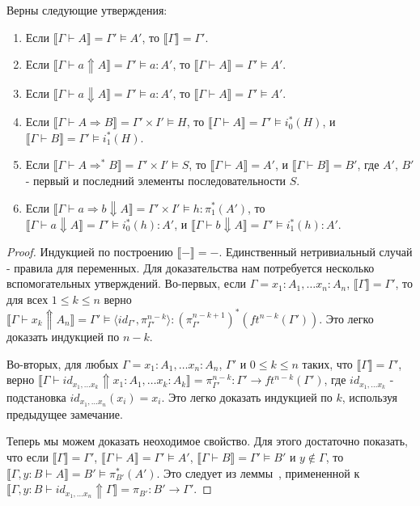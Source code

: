 \documentclass{amsart}
\theoremstyle{definition}
\theoremstyle{remark}
\newcommand{\red}{\Rightarrow}
\renewcommand{\ll}{\llbracket}
\newcommand{\rr}{\rrbracket}
\numberwithin{figure}{section}
\begin{document}
\begin{lem}
Верны следующие утверждения:
\begin{enumerate}
\item Если $\ll \Gamma \vdash A \rr = \Gamma' \models A'$, то $\ll \Gamma \rr = \Gamma'$.
\item Если $\ll \Gamma \vdash a \Uparrow A \rr = \Gamma' \models a : A'$, то $\ll \Gamma \vdash A \rr = \Gamma' \models A'$.
\item Если $\ll \Gamma \vdash a \Downarrow A \rr = \Gamma' \models a : A'$, то $\ll \Gamma \vdash A \rr = \Gamma' \models A'$.
\item Если $\ll \Gamma \vdash A \red B \rr = \Gamma' \times I' \models H$, то $\ll \Gamma \vdash A \rr = \Gamma' \models i_0^*(H)$, и $\ll \Gamma \vdash B \rr = \Gamma' \models i_1^*(H)$.
\item Если $\ll \Gamma \vdash A \red^* B \rr = \Gamma' \times I' \models S$, то $\ll \Gamma \vdash A \rr = A'$, и $\ll \Gamma \vdash B \rr = B'$, где $A'$, $B'$ - первый и последний элементы последовательности $S$.
\item Если $\ll \Gamma \vdash a \red b \Downarrow A\rr = \Gamma' \times I' \models h : \pi_1^*(A')$, то $\ll \Gamma \vdash a \Downarrow A \rr = \Gamma' \models i_0^*(h) : A'$, и $\ll \Gamma \vdash b \Downarrow A \rr = \Gamma' \models i_1^*(h) : A'$.
\end{enumerate}
\end{lem}
\begin{proof}
Индукцией по построению $\ll - \rr = -$.
Единственный нетривиальный случай - правила для переменных.
Для доказательства нам потребуется несколько вспомогательных утверждений.
Во-первых, если $\Gamma = x_1 : A_1, \ldots x_n : A_n$, $\ll \Gamma \rr = \Gamma'$, то для всех $1 \leq k \leq n$ верно $\ll \Gamma \vdash x_k \Uparrow A_n \rr = \Gamma' \models \langle id_{\Gamma'}, \pi^{n-k}_{\Gamma'} \rangle : (\pi^{n-k+1}_{\Gamma'})^*(ft^{n-k}(\Gamma')) $.
Это легко доказать индукцией по $n - k$.

Во-вторых, для любых $\Gamma = x_1 : A_1, \ldots x_n : A_n$, $\Gamma'$ и $0 \leq k \leq n$ таких, что $\ll \Gamma \rr = \Gamma'$, верно $\ll \Gamma \vdash id_{x_1, \ldots x_k} \Uparrow x_1 : A_1, \ldots x_k : A_k \rr = \pi^{n-k}_{\Gamma'} : \Gamma' \to ft^{n-k}(\Gamma')$, где $id_{x_1, \ldots x_k}$ - подстановка $id_{x_1, \ldots x_n}(x_i) = x_i$.
Это легко доказать индукцией по $k$, используя предыдущее замечание.

Теперь мы можем доказать неоходимое свойство.
Для этого достаточно показать, что если $\ll \Gamma \rr = \Gamma'$, $\ll \Gamma \vdash A \rr = \Gamma' \models A'$, $\ll \Gamma \vdash B \rr = \Gamma' \models B'$ и $y \notin \Gamma$, то $\ll \Gamma, y : B \vdash A \rr = B' \models \pi_{B'}^*(A')$.
Это следует из леммы~, примененной к $\ll \Gamma, y : B \vdash id_{x_1, \ldots x_n} \Uparrow \Gamma \rr = \pi_{B'} : B' \to \Gamma'$.
\end{proof}
\end{document}

